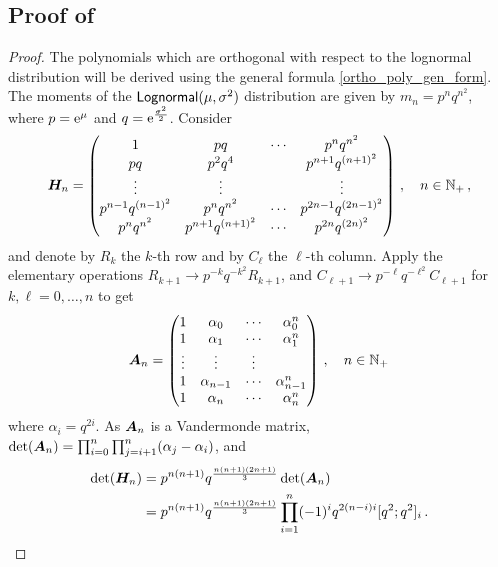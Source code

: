 \begin{subappendices}
\section{Proof of } \label{app:lognormal_poly}
\begin{proof}
The polynomials which are orthogonal with respect to the lognormal distribution will be derived using the general formula \eqref{ortho_poly_gen_form}.
The moments of the $\mathsf{Lognormal}(\mu, \sigma^2)$ distribution are given by $m_{n}=p^{n}q^{n^{2}}$, where $p=\mathrm{e}^{\mu}$ and $q=\mathrm{e}^{\frac{\sigma^{2}}{2}}$. Consider
\begin{equation}\label{eq:Dn1}
\bm{H}_n=\begin{pmatrix}
1&pq&\cdots&p^{n}q^{n^{2}} \\
pq&p^{2}q^{4}&&p^{n+1}q^{(n+1)^{2}}\\
\vdots&\vdots&&\vdots\\
p^{n-1}q^{(n-1)^{2}}&p^{n}q^{n^{2}}&\cdots&p^{2n-1}q^{(2n-1)^{2}}\\
p^{n}q^{n^{2}}&p^{n+1}q^{(n+1)^{2}}&\cdots&p^{2n}q^{(2n)^{2}}
\end{pmatrix}
\,, \quad n \in \mathbb{N}_+\,,
\end{equation}
and denote by $R_{k}$ the $k$-th row and by $C_{\ell}$ the $\ell$-th column. Apply the elementary operations $R_{k+1}\rightarrow p^{-k}q^{-k^{2}}R_{k+1}$, and $C_{\ell+1}\rightarrow p^{-\ell}q^{-\ell^{2}}C_{\ell+1}$ for $k,\ell=0,\ldots,n$ to get
\begin{equation} \label{vand}
\bm{A}_n = \begin{pmatrix}
1 & \alpha_0 & \cdots & \alpha_0^n \\
1 & \alpha_1 & \cdots & \alpha_1^n \\
\vdots&\vdots&\vdots\\
1 & \alpha_{n-1} & \cdots & \alpha_{n-1}^n\\
1 & \alpha_n     & \cdots & \alpha_n^n
\end{pmatrix}
\,, \quad n \in \mathbb{N}_+\,
\end{equation}
where $\alpha_i=q^{2i}$. As $\bm{A}_n$ is a Vandermonde matrix, $\det(\bm{A}_n) = \prod_{i=0}^{n} \prod_{j=i+1}^{n} (\alpha_j - \alpha_i)$, and
\begin{align}
\det(\bfH_n)
&= p^{n(n+1)} q^{\frac{n(n+1)(2n+1)}{3}} \det(\bfA_n) \label{detA_detH} \\
&= p^{n(n+1)} q^{\frac{n(n+1)(2n+1)}{3}}
\prod_{i=1}^{n} (-1)^i q^{2(n-i)i} [q^2; q^2]_i \,. \label{det_H}

\end{align}
\end{proof}
\end{subappendices}
